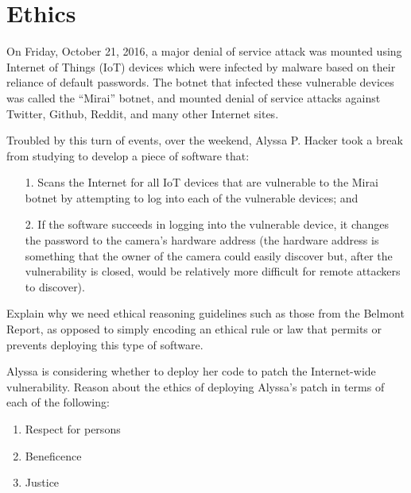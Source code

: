 \section{Ethics}

On Friday, October 21, 2016, a major denial of service attack was
mounted using Internet of Things (IoT) devices which were infected by
malware based on their reliance of default passwords. The botnet that
infected these vulnerable devices was called the ``Mirai'' botnet, and
mounted denial of service attacks against Twitter, Github, Reddit, and
many other Internet sites.

Troubled by this turn of events, over the weekend, Alyssa P. Hacker took a break from
studying to develop a 
piece of software that:
\begin{enumerate}
\item[1.] Scans the Internet for all IoT devices that are vulnerable to the
  Mirai botnet by attempting to log into each of the vulnerable devices; and
\item[2.] If the software succeeds in logging into the vulnerable device, it
  changes the password to the camera's hardware address (the hardware
  address is something that the owner of the camera could easily
  discover but, after the vulnerability is closed, would be relatively
  more difficult for remote attackers to discover).
\end{enumerate}

 Explain why we need ethical reasoning guidelines such as those
from the Belmont Report, as opposed to simply encoding an ethical rule
or law that permits or prevents deploying this type of software.
\eprob


\newpage
{} Alyssa is considering whether to deploy her code to patch the
Internet-wide vulnerability.  Reason about the ethics of deploying Alyssa's
patch in terms of each of the following:
\begin{enumerate}
\item Respect for persons
\item Beneficence
\item Justice
\end{enumerate}
\eprob

